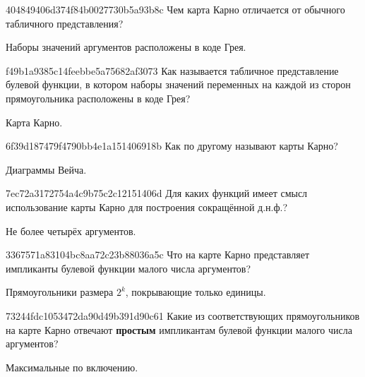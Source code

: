 \begin{note}{404849406d374f84b0027730b5a93b8c}
    Чем карта Карно отличается от обычного табличного представления?

    \begin{cloze}{1}
        Наборы значений аргументов расположены в коде Грея.
    \end{cloze}
\end{note}

\begin{note}{f49b1a9385c14feebbe5a75682af3073}
    Как называется табличное представление булевой функции, в котором наборы значений переменных на каждой из сторон прямоугольника расположены в коде Грея?

    \begin{cloze}{1}
        Карта Карно.
    \end{cloze}
\end{note}

\begin{note}{6f39d187479f4790bb4e1a151406918b}
    Как по другому называют карты Карно?

    \begin{cloze}{1}
        Диаграммы Вейча.
    \end{cloze}
\end{note}

\begin{note}{7ec72a3172754a4c9b75c2c12151406d}
    Для каких функций имеет смысл использование карты Карно для построения сокращённой д.н.ф.?

    \begin{cloze}{1}
        Не более четырёх аргументов.
    \end{cloze}
\end{note}

\begin{note}{3367571a83104bc8aa72c23b88036a5c}
    Что на карте Карно представляет импликанты булевой функции малого числа аргументов?

    \begin{cloze}{1}
        Прямоугольники размера \({ 2^{k} }\), покрывающие только единицы.
    \end{cloze}
\end{note}

\begin{note}{73244fdc1053472da90d49b391d90c61}
    Какие из соответствующих прямоугольников на карте Карно отвечают \textbf{простым} импликантам булевой функции малого числа аргументов?

    \begin{cloze}{1}
        Максимальные по включению.
    \end{cloze}
\end{note}

